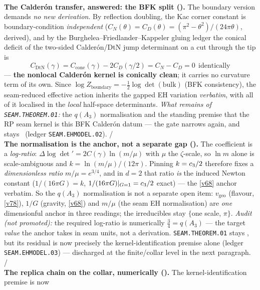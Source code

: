 \begin{gapbox}
\smallskip\\
\noindent\textbf{The Calder\'on transfer, answered: the BFK split ().} The
boundary version demands \emph{no new derivation}. By reflection doubling, the Kac corner constant is
boundary-condition \emph{independent} ($C_N(\theta)=C_D(\theta)=(\pi^2{-}\theta^2)/(24\pi\theta)$,
derived), and by the Burghelea--Friedlander--Kappeler gluing ledger the conical deficit of the two-sided
Calder\'on/DtN jump determinant on a cut through the tip is
\[
  \boxed{\ C_{\mathrm{DtN}}(\gamma)=C_{\mathrm{cone}}(\gamma)-2C_D(\gamma/2)=C_N-C_D=0\ \ \text{identically}\ }
\]
--- \textbf{the nonlocal Calder\'on kernel is conically clean}; it carries no curvature term of its own.
Since $\log Z_{\mathrm{boundary}}=-\tfrac12\log\det(\mathrm{bulk})$ (BFK consistency), the seam-reduced
effective action inherits the gapped EH variation \emph{verbatim}, with all of it localised in the
\emph{local} half-space determinants. \emph{What remains of \texttt{SEAM.THEOREM.01}:} the $q(A_3)$
normalisation and the standing premise that the RP seam kernel is this BFK Calder\'on datum --- the gate
narrows again, and stays \mO\ (ledger \texttt{SEAM.EHMODEL.02}). \mE/\mO
\smallskip\\
\noindent\textbf{The normalisation is the anchor, not a separate gap ().}
The coefficient is a \emph{log-ratio}: $\Delta\log\det'=2C(\gamma)\ln(m/\mu)$ with $\mu$ the $\zeta$-scale,
so $\ln m$ alone is scale-ambiguous and $k=\ln(m/\mu)/(12\pi)$. Pinning $k=c_3/2$ therefore fixes a
\emph{dimensionless ratio} $m/\mu=e^{3/4}$, and in $d{=}2$ that ratio \emph{is} the induced Newton constant
($1/(16\pi G)=k$, $1/(16\pi G)|_{G=1}=c_3/2$ exact) --- the \vref{v68} anchor verbatim. So the
$q(A_3)$ normalisation is not a separate open item: $v_{\mathrm{geo}}$ (flavour, \vref{v78}), $1/G$
(gravity, \vref{v68}) and $m/\mu$ (the seam EH normalisation) are \emph{one} dimensionful anchor in three
readings; the irreducibles stay $\{$one scale, $\pi\}$. \emph{Audit (not promoted):} the required log-ratio
is numerically $\tfrac34=q(A_3)$ --- the target \emph{value} the anchor takes in seam units, not a
derivation. \texttt{SEAM.THEOREM.01} stays \mO, but its residual is now precisely the
kernel-identification premise alone (ledger \texttt{SEAM.EHMODEL.03}) --- discharged at the
finite/collar level in the next paragraph. \mE/\mO
\smallskip\\
\noindent\textbf{The replica chain on the collar, numerically
().} The kernel-identification premise is now

\end{gapbox}
